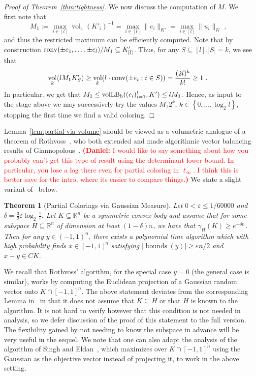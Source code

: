 \documentclass[12pt]{article}
\newtheorem{theorem}{Theorem}
\newcommand{\R}{{\mathbb{R}}}
\newcommand\eps{\varepsilon}
\newcommand{\set}[1]{\left\{ #1 \right\}}
\DeclareMathOperator{\vollb}{volLB}
\DeclareMathOperator{\vol}{vol}
\DeclareMathOperator{\bnds}{bounds}
\newcommand{\notename}[2]{{\textcolor{red}{{\bf (#1:} {#2}{\bf ) }}}}
\newcommand{\notename}[2]{{\textcolor{red}{\footnotesize{\bf (#1:} {#2}{\bf ) }}}}
\newcommand{\dnote}[1]{{\notename{Daniel}{#1}}}
\newcommand{\notename}[2]{{}}
\newcommand{\dnote}[1]{}
\begin{document}
\begin{proof}[Proof of Theorem~\ref{thm:tightness}]
We now discuss the computation of $M$. We first note that 
\[
M_1 := \max_{i \in [l]} \vol_1(K'_i)^{-1} = \max_{i \in [l]} \|e_i\|_{K'} =
\max_{i \in [l]} \|u_i\|_K \text{ ,}
\]
and thus the restricted maximum can be efficiently computed. Note that by
construction ${\rm conv}(\pm e_1,\dots, \pm e_l)/M_1 \subseteq K'_{[l]}$. Thus,
for any $S \subseteq [l]$,$|S|=k$, we see that
\[
\vol_k(l M_1 K'_S) \geq \vol_{k}(l \cdot {\rm conv}(\pm e_i: i \in S)) = \frac{(2l)^k}{k!}
 \geq 1 \text{ .}
\]
In particular, we get that $M_1 \leq \vollb_{\rm h}((e_i)_{i=1}^l,K') \leq l M_1$.
Hence, as input to the stage above we may successively try the values $M_1
2^k$, $k \in \set{0,\dots,\log_2 l}$, stopping the first time we find a valid
coloring. 
\end{proof}

Lemma~\ref{lem:partial-via-volume} should be viewed as a volumetric analogue of
a theorem of Rothvoss~\cite{rothvoss-giann}, who both extended and made
algorithmic vector balancing results of Giannopolous~\cite{giannop}. \dnote{I
would like to say something about how you probably can't get this type of result
using the determinant lower bound. In particular, you lose a log there even for
partial coloring in $\ell_\infty$. I think this is better save for the intro,
where its easier to compare things.} We state a slight variant of~\cite[Lemma 9]{rothvoss-giann} below.

\begin{theorem}[Partial Colorings via Gaussian Measure]\label{thm:roth-giann}
Let $0 < \eps \leq 1/60000$ and $\delta = \frac{3}{2}\eps \log_2
\frac{1}{\eps}$. Let $K \subseteq \R^n$ be a symmetric convex body and assume
that for some subspace $H \subseteq \R^n$ of dimension at least $(1-\delta)n$,
we have that $\gamma_H(K) \geq e^{-\delta n}$. Then for any $y \in (-1,1)^n$,
there exists a polynomial time algorithm which with high probability finds $x
\in [-1,1]^n$ satisfying $|\bnds(y)| \geq \eps n/2$ and
$x-y \in CK$.
\end{theorem}

We recall that Rothvoss' algorithm, for the special case $y = 0$ (the general
case is similar), works by computing the Euclidean projection of a Gaussian
random vector onto $K \cap [-1,1]^n$. The above statement deviates from the
corresponding Lemma in~\cite{rothvoss-giann} in that it does not assume that $K
\subseteq H$ or that $H$ is known to the algorithm. It is not hard to verify
however that this condition is not needed in analysis, so we defer discussion of
the proof of this statement to the full version. The flexibility gained by not
needing to know the subspace in advance will be very useful in the sequel. We
note that one can also adapt the analysis of the algorithm of Singh and
Eldan~\cite{ES14}, which maximizes over $K \cap [-1,1]^n$ using the Gaussian as
the objective vector instead of projecting it, to work in the above setting.   
\end{document}
